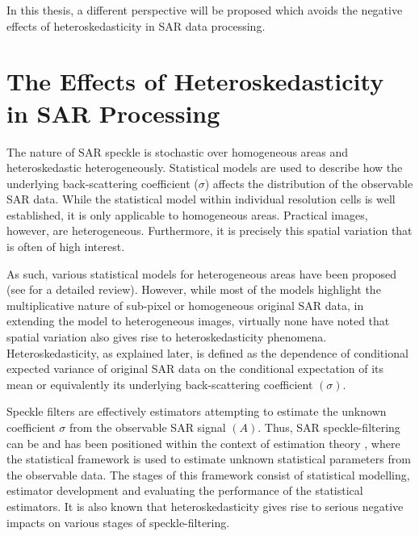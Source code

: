 In this thesis, a different perspective will be proposed which avoids the negative effects of heteroskedasticity in SAR data processing.
 
\section{The Effects of Heteroskedasticity in SAR Processing}%
\label{sec:heteroskedastic_sar_processing}


The nature of SAR speckle is stochastic over homogeneous areas and heteroskedastic heterogeneously. 
Statistical models are used to describe how the underlying back-scattering coefficient ($\sigma$) affects the distribution of the observable SAR data. 
While the statistical model within individual resolution cells is well established,
  it is only applicable to homogeneous areas.
Practical images, however, are heterogeneous.
Furthermore, it is precisely this spatial variation that is often of high interest.

As such, various statistical models for heterogeneous areas have been proposed (see \cite{Touzi_2002_TGRS} for a detailed review). 
However, while most of the models highlight the multiplicative nature of sub-pixel or homogeneous original SAR data, in extending the model to heterogeneous images, virtually none have noted that spatial variation also gives rise to heteroskedasticity phenomena. 
Heteroskedasticity, as explained later, is defined as the dependence of conditional expected variance of original SAR data on the conditional expectation of its mean or equivalently its underlying back-scattering coefficient $(\sigma)$. 

Speckle filters are effectively estimators attempting to estimate the unknown coefficient $\sigma$ from the observable SAR signal $(A)$. 
Thus, SAR speckle-filtering can be and has been positioned within the context of estimation theory \cite{Touzi_2002_TGRS}, where
the statistical framework is used to estimate unknown statistical parameters from the observable data. 
The stages of this framework consist of statistical modelling, estimator development and evaluating the performance of the statistical estimators. 
It is also known that heteroskedasticity gives rise to serious negative impacts on various stages of speckle-filtering. 

